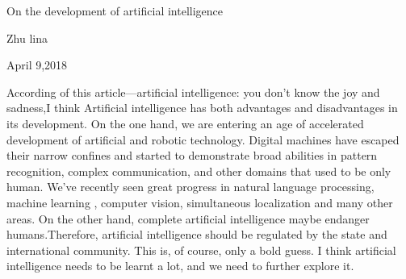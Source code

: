 \documentclass{article}
\begin{document}
                                     	\begin{center} 
                                   On the development of artificial intelligence\\  
                                        \end{center}               
                     
                                         \begin{center} 
                                         	Zhu lina\\
                                         	\end{center}
                                           \begin{center} 
                                            April 9,2018\\
                                           \end{center}
         According of this article---artificial intelligence: you don't know the joy and sadness,I
         think  Artificial  intelligence  has  both  advantages  and  disadvantages  in its 
         development.  On  the  one  hand, we  are  entering  an age  of  accelerated  development
         of  artificial  and  robotic  technology.  Digital machines  have  escaped  their  narrow 
         confines  and  started  to  demonstrate broad  abilities  in  pattern recognition, complex
         communication,  and  other domains  that  used  to  be  only human. We've  recently  seen
         great progress  in  natural  language  processing,  machine learning ,  computer  vision,
         simultaneous  localization  and  many  other areas. On  the  other hand, complete
         artificial  intelligence  maybe  endanger  humans.Therefore,  artificial intelligence  should 
         be  regulated  by  the  state  and  international community.  This  is,  of course,  only  
         a  bold  guess. I  think  artificial  intelligence needs  to  be  learnt  a  lot,  and  we  
         need  to  further  explore  it.
\end{document}
